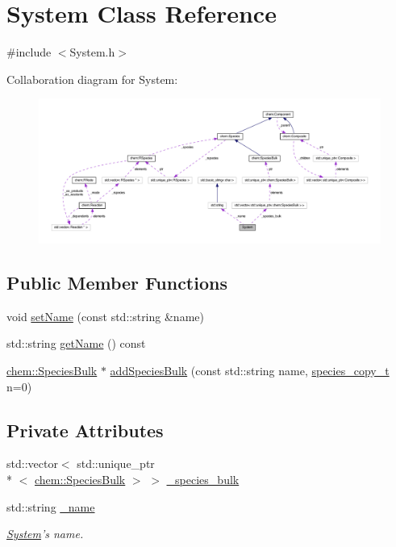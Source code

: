 \hypertarget{classSystem}{\section{System Class Reference}
\label{classSystem}
}


{\ttfamily \#include $<$System.\-h$>$}



Collaboration diagram for System\-:
\nopagebreak
\begin{figure}[H]
\begin{center}
\leavevmode
\includegraphics[width=350pt]{classSystem__coll__graph}
\end{center}
\end{figure}
\subsection*{Public Member Functions}
\begin{DoxyCompactItemize}
\item 
void \hyperlink{classSystem_a6f4360b4a491316bc77e6c310cdf6512}{set\-Name} (const std\-::string \&name)
\item 
std\-::string \hyperlink{classSystem_a774d78ae771d47f38d09c288298f936a}{get\-Name} () const 
\item 
\hyperlink{classchem_1_1SpeciesBulk}{chem\-::\-Species\-Bulk} $\ast$ \hyperlink{classSystem_a141acd0fd533f36a1ae9e12b6b8ecda7}{add\-Species\-Bulk} (const std\-::string name, \hyperlink{common_8h_a3503f321fd36304ee274141275cca586}{species\-\_\-copy\-\_\-t} n=0)
\end{DoxyCompactItemize}
\subsection*{Private Attributes}
\begin{DoxyCompactItemize}
\item 
std\-::vector$<$ std\-::unique\-\_\-ptr\\*
$<$ \hyperlink{classchem_1_1SpeciesBulk}{chem\-::\-Species\-Bulk} $>$ $>$ \hyperlink{classSystem_a58cada67a766fc38e52ed4abfd373486}{\-\_\-species\-\_\-bulk}
\item 
std\-::string \hyperlink{classSystem_a096b362d79b514fee041ff52259642d3}{\-\_\-name}
\begin{DoxyCompactList}\small\item\em \hyperlink{classSystem}{System}'s name. \end{DoxyCompactList}\end{DoxyCompactItemize}


